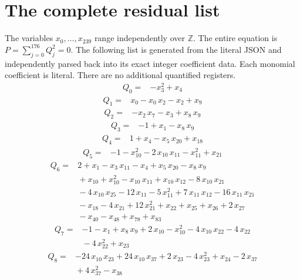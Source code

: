 \documentclass[11pt]{article}
\theoremstyle{definition}\newtheorem{definition}[theorem]{Definition}
\newcommand{\Z}{\mathbb Z}\newcommand{\N}{\mathbb N}
\newcommand{\MainLast}{239}
\newcommand{\MainRowLast}{176}
\begin{document}
\section{The complete residual list}\label{app:residuals}
The variables \(x_0,\ldots,x_{\MainLast}\) range independently over \(\Z\).
The entire equation is \(P=\sum_{j=0}^{\MainRowLast}Q_j^2=0\).
The following list is generated from the literal JSON and independently parsed back into its exact integer coefficient data. Each monomial coefficient is literal. There are no additional quantified registers.
\begingroup\small\setlength{\jot}{1pt}
\begin{align*}
Q_{0}={}&-x_{3}^{2}+x_{4}
\end{align*}
\begin{align*}
Q_{1}={}&x_{0}-x_{0}\,x_{2}-x_{2}+x_{9}
\end{align*}
\begin{align*}
Q_{2}={}&-x_{2}\,x_{7}-x_{3}+x_{8}\,x_{9}
\end{align*}
\begin{align*}
Q_{3}={}&-1+x_{1}-x_{8}\,x_{9}
\end{align*}
\begin{align*}
Q_{4}={}&1+x_{4}-x_{5}\,x_{20}+x_{18}
\end{align*}
\begin{align*}
Q_{5}={}&-1-x_{10}^{2}-2\,x_{10}\,x_{11}-x_{11}^{2}+x_{21}
\end{align*}
\begin{align*}
Q_{6}={}&2+x_{1}-x_{3}\,x_{11}-x_{4}+x_{5}\,x_{20}-x_{8}\,x_{9}
\\ &{}+x_{10}+x_{10}^{2}-x_{10}\,x_{11}+x_{10}\,x_{12}-8\,x_{10}\,x_{21}
\\ &{}-4\,x_{10}\,x_{25}-12\,x_{11}-5\,x_{11}^{2}+7\,x_{11}\,x_{12}-16\,x_{11}\,x_{21}
\\ &{}-x_{18}-4\,x_{21}+12\,x_{21}^{2}+x_{22}+x_{25}+x_{26}+2\,x_{27}
\\ &{}-x_{40}-x_{48}+x_{78}+x_{83}
\end{align*}
\begin{align*}
Q_{7}={}&-1-x_{1}+x_{8}\,x_{9}+2\,x_{10}-x_{10}^{2}-4\,x_{10}\,x_{22}-4\,x_{22}
\\ &{}-4\,x_{22}^{2}+x_{23}
\end{align*}
\begin{align*}
Q_{8}={}&-24\,x_{10}\,x_{23}+24\,x_{10}\,x_{37}+2\,x_{23}-4\,x_{23}^{2}+x_{24}-2\,x_{37}
\\ &{}+4\,x_{37}^{2}-x_{38}
\end{align*}
\end{document}
